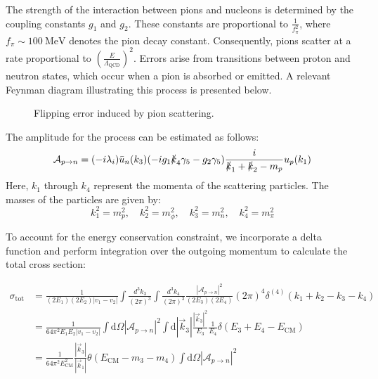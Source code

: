 \documentclass[11pt,english]{article}
\newcommand{\dee}{\mathrm{d}}
\begin{document}
The strength of the interaction between pions and nucleons is determined by the coupling constants $g_1$ and $g_2$. These constants are proportional to $\frac{1}{f_{\pi}^2}$, where $f_{\pi}\sim 100~\text{MeV}$ denotes the pion decay constant. Consequently, pions scatter at a rate proportional to $(\frac{E}{\Lambda_{\text{QCD}}})^2$. Errors arise from transitions between proton and neutron states, which occur when a pion is absorbed or emitted. A relevant Feynman diagram illustrating this process is presented below. 
\begin{figure}[H]
\centering
{}
\caption{Flipping error induced by pion scattering.}
\end{figure}

The amplitude for the process can be estimated as follows:
\begin{equation}
\begin{split}
\mathcal{A}_{p\rightarrow n} = (-i\lambda_i)\bar{u}_n(k_3)(-ig_1\slashed{k}_4\gamma_5-g_2\gamma_5)\frac{i}{\slashed{k}_1+\slashed{k}_2-m_p}u_p(k_1)
\end{split}
\end{equation}
Here, $k_1$ through $k_4$ represent the momenta of the scattering particles. The masses of the particles are given by:
\begin{equation}
k_1^2=m_p^2, \quad k_2^2=m_{\phi}^2, \quad k_3^2=m_{n}^2, \quad k_4^2=m_{\pi}^2
\end{equation}

To account for the energy conservation constraint, we incorporate a delta function and perform integration over the outgoing momentum to calculate the total cross section:

\begin{equation}
\begin{split}
\sigma_{\text{tot}} &= \frac{1}{(2E_1)(2E_2)|v_1-v_2|}\int \frac{d^3k_3}{(2\pi)^3}\int \frac{d^3k_4}{(2\pi)^3} \frac{|\mathcal{A}_{p\rightarrow n}|^2}{(2E_3)(2E_4)}(2\pi)^4\delta^{(4)}(k_1+k_2-k_3-k_4)\\
&= \frac{1}{64\pi^2E_1E_2|v_1-v_2|} \int \dee\Omega |\mathcal{A}_{p\rightarrow n}|^2 \int \dee|\vec{k}_3| \frac{|\vec{k}_3|^2}{E_3}\frac{1}{E_4}\delta(E_3+E_4-E_{\text{CM}})\\
&= \frac{1}{64\pi^2E_{\text{CM}}^2} \frac{|\vec{k}_3|}{|\vec{k}_1|}\theta(E_{\text{CM}}-m_3-m_4) \int \dee\Omega |\mathcal{A}_{p\rightarrow n}|^2
\end{split}
\end{equation}
\end{document}
